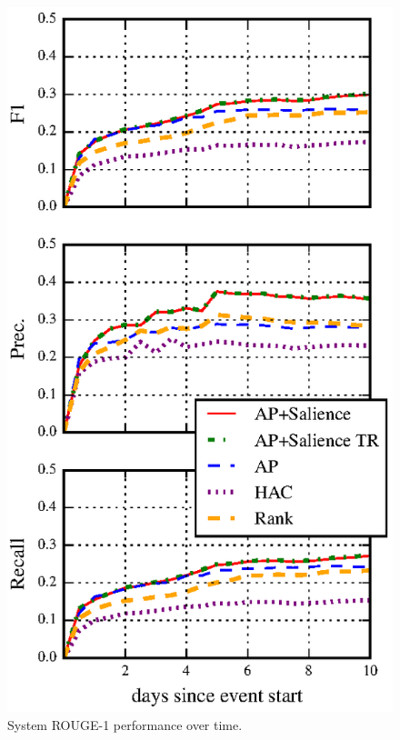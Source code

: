 \begin{figure}
    \includegraphics[]{rouge-time.eps}
\caption{System ROUGE-1 performance over time.}
\label{fig:trouge}
\end{figure}

